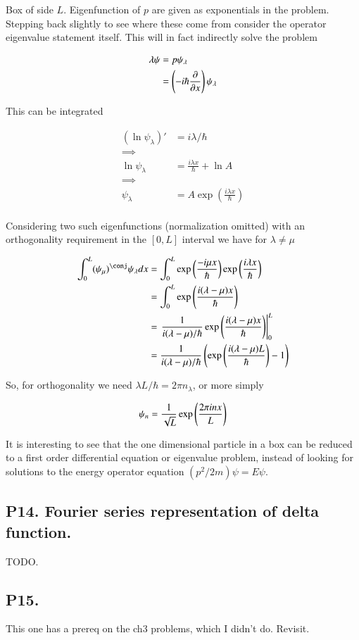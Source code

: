 Box of side $L$.  Eigenfunction of $p$ are given as exponentials in the problem.  Stepping back slightly to see where these come from 
consider the operator eigenvalue statement itself.  This will in fact indirectly solve the problem

\begin{align*}
\lambda \psi 
&= p \psi_\lambda \\
&= \left(-i \hbar \frac{\partial {}}{\partial {x}} \right) \psi_\lambda \\
\end{align*}

This can be integrated

\begin{align*}
(\ln \psi_\lambda)' &= i \lambda/\hbar \\
\implies \\
\ln \psi_\lambda &= \frac{i \lambda x }{\hbar} + \ln A \\
\implies \\
\psi_\lambda &= A \exp\left( \frac{i \lambda x }{\hbar} \right) \\
\end{align*}

Considering two such eigenfunctions (normalization omitted) with an orthogonality requirement in the $[0,L]$ interval we have for $\lambda \ne \mu$

\begin{align*}
\int_0^L (\psi_\mu)^\conj \psi_\lambda dx 
&=
\int_0^L 
\exp\left( \frac{-i \mu x }{\hbar} \right) \exp\left( \frac{i \lambda x }{\hbar} \right) \\
&=
\int_0^L \exp\left( \frac{i (\lambda -\mu) x }{\hbar} \right) \\
&=
\left. \inv{ i (\lambda -\mu)/\hbar} \exp\left( \frac{i (\lambda -\mu) x }{\hbar} \right) \right\vert_{0}^L
 \\
&=
\inv{ i (\lambda -\mu)/\hbar} \left( \exp\left( \frac{i (\lambda -\mu) L }{\hbar} \right) - 1 \right)
 \\
\end{align*}

So, for orthogonality we need $\lambda L/\hbar = 2\pi n_\lambda$, or more simply

\begin{align*}
\psi_n = \frac{1}{\sqrt{L}} \exp\left( \frac{ 2 \pi i n x }{L } \right) \\
\end{align*}

It is interesting to see that the one dimensional particle in a box can be reduced to a first order differential equation or 
eigenvalue problem, instead of looking for solutions to the energy operator equation $(p^2/2m) \psi = E \psi$.

\subsection{P14. Fourier series representation of delta function. }

TODO.

\subsection{P15. }

This one has a prereq on the ch3 problems, which I didn't do.  Revisit.

%
%

%
